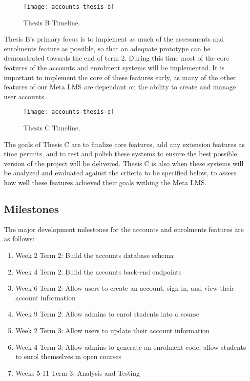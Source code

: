 \begin{figure}[h!]
    \centering
    \texttt{[image: accounts-thesis-b]}
    \caption{Thesis B Timeline.}
\end{figure}
Thesis B's primary focus is to implement as much of the assessments and enrolments feature as possible, so that an adequate prototype can be demonstrated towards the end of term 2. During this time most of the core features of the accounts and enrolment systems will be implemented. It is important to implement the core of these features early, as many of the other features of our Meta LMS are dependant on the ability to create and manage user accounts.

\begin{figure}[h!]
    \centering
    \texttt{[image: accounts-thesis-c]}
    \caption{Thesis C Timeline.}
\end{figure}
The goals of Thesis C are to finalize core features, add any extension features as time permits, and to test and polish these systems to ensure the best possible version of the project will be delivered. Thesis C is also when these systems will be analyzed and evaluated against the criteria to be specified below, to assess how well these features achieved their goals withing the Meta LMS.

\subsection{Milestones}
The major development milestones for the accounts and enrolments features are as follows:
    \begin{enumerate}
        \item Week 2 Term 2: Build the accounts database schema
        \item Week 4 Term 2: Build the accounts back-end endpoints
        \item Week 6 Term 2: Allow users to create an account, sign in, and view their account information
        \item Week 9 Term 2: Allow admins to enrol students into a course
        \item Week 2 Term 3: Allow users to update their account information
        \item Week 4 Term 3: Allow admins to generate an enrolment code, allow students to enrol themselves in open courses
        \item Weeks 5-11 Term 3: Analysis and Testing
    \end{enumerate}

